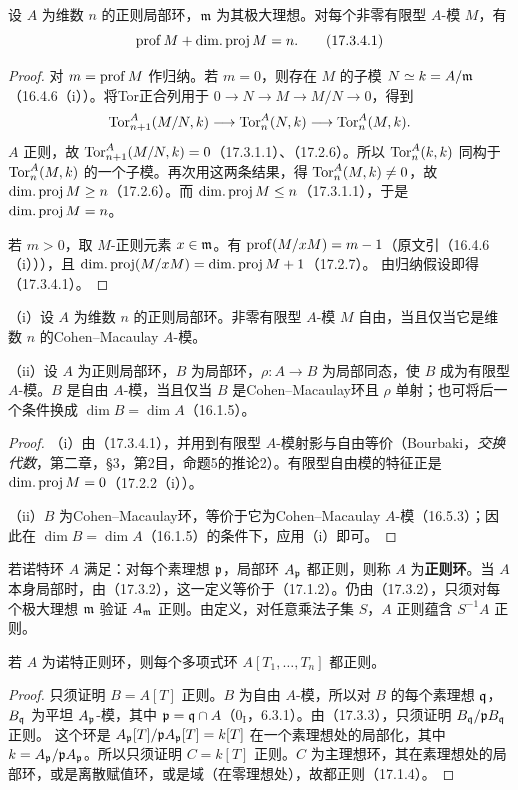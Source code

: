 设 $A$ 为维数 $n$ 的正则局部环，$\mathfrak m$ 为其极大理想。对每个非零有限型 $A$-模 $M$，有
\begin{equation}
 \operatorname{prof} M+\operatorname{dim.proj} M=n.
 \tag{17.3.4.1}
\end{equation}
\begin{proof}
对 $m=\operatorname{prof} M$ 作归纳。若 $m=0$，则存在 $M$ 的子模 $N\simeq k=A/\mathfrak m$（16.4.6（i））。将Tor正合列用于
$0\to N\to M\to M/N\to0$，得到
\[
 \operatorname{Tor}_{n+1}^A(M/N,k)\longrightarrow\operatorname{Tor}_n^A(N,k)
 \longrightarrow\operatorname{Tor}_n^A(M,k).
\]
$A$ 正则，故 $\operatorname{Tor}_{n+1}^A(M/N,k)=0$（17.3.1.1）、（17.2.6）。所以 $\operatorname{Tor}_n^A(k,k)$ 同构于 $\operatorname{Tor}_n^A(M,k)$ 的一个子模。再次用这两条结果，得 $\operatorname{Tor}_n^A(M,k)\ne0$，故 $\operatorname{dim.proj} M\geq n$（17.2.6）。而 $\operatorname{dim.proj} M\leq n$（17.3.1.1），于是 $\operatorname{dim.proj} M=n$。

若 $m>0$，取 $M$-正则元素 $x\in\mathfrak m$。有 $\operatorname{prof}(M/xM)=m-1$（原文引（16.4.6（i））），且 $\operatorname{dim.proj}(M/xM)=\operatorname{dim.proj} M+1$（17.2.7）。
由归纳假设即得（17.3.4.1）。
\end{proof}

（i）设 $A$ 为维数 $n$ 的正则局部环。非零有限型 $A$-模 $M$ 自由，当且仅当它是维数 $n$ 的Cohen--Macaulay $A$-模。

（ii）设 $A$ 为正则局部环，$B$ 为局部环，$\rho:A\to B$ 为局部同态，使 $B$ 成为有限型 $A$-模。$B$ 是自由 $A$-模，当且仅当 $B$ 是Cohen--Macaulay环且 $\rho$ 单射；也可将后一个条件换成 $\dim B=\dim A$（16.1.5）。
\begin{proof}
（i）由（17.3.4.1），并用到有限型 $A$-模射影与自由等价（Bourbaki，\textit{交换代数}，第二章，§3，第2目，命题5的推论2）。有限型自由模的特征正是 $\operatorname{dim.proj} M=0$（17.2.2（i））。

（ii）$B$ 为Cohen--Macaulay环，等价于它为Cohen--Macaulay $A$-模（16.5.3）；因此在 $\dim B=\dim A$（16.1.5）的条件下，应用（i）即可。
\end{proof}

若诺特环 $A$ 满足：对每个素理想 $\mathfrak p$，局部环 $A_{\mathfrak p}$ 都正则，则称 $A$ 为\textbf{正则环}。当 $A$ 本身局部时，由（17.3.2），这一定义等价于（17.1.2）。仍由（17.3.2），只须对每个极大理想 $\mathfrak m$ 验证 $A_{\mathfrak m}$ 正则。由定义，对任意乘法子集 $S$，$A$ 正则蕴含 $S^{-1}A$ 正则。

若 $A$ 为诺特正则环，则每个多项式环 $A[T_1,\ldots,T_n]$ 都正则。
\begin{proof}
只须证明 $B=A[T]$ 正则。$B$ 为自由 $A$-模，所以对 $B$ 的每个素理想 $\mathfrak q$，$B_{\mathfrak q}$ 为平坦 $A_{\mathfrak p}$-模，其中 $\mathfrak p=\mathfrak q\cap A$（$0_{\mathrm I}$，6.3.1）。由（17.3.3），只须证明 $B_{\mathfrak q}/\mathfrak p B_{\mathfrak q}$ 正则。
这个环是 $A_{\mathfrak p}[T]/\mathfrak p A_{\mathfrak p}[T]=k[T]$ 在一个素理想处的局部化，其中 $k=A_{\mathfrak p}/\mathfrak p A_{\mathfrak p}$。所以只须证明 $C=k[T]$ 正则。$C$ 为主理想环，其在素理想处的局部环，或是离散赋值环，或是域（在零理想处），故都正则（17.1.4）。
\end{proof}

